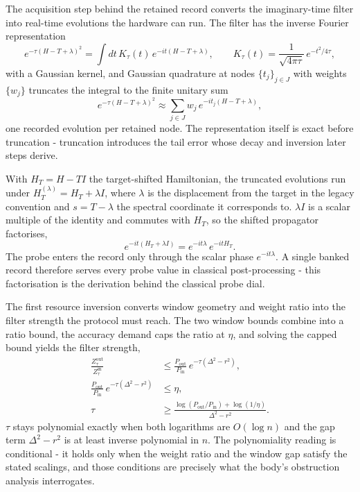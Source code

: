 The acquisition step behind the retained record converts the imaginary-time filter into real-time evolutions the hardware can run. The filter has the inverse Fourier representation
\begin{equation*}
e^{-\tau (H - T + \lambda)^2} = \int dt \, K_\tau(t) \, e^{-i t (H - T + \lambda)} , \qquad
K_\tau(t) = \frac{1}{\sqrt{4 \pi \tau}} \, e^{-t^2 / 4\tau} ,
\end{equation*}
with a Gaussian kernel, and Gaussian quadrature at nodes $\{t_j\}_{j \in J}$ with weights $\{w_j\}$ truncates the integral to the finite unitary sum
\begin{equation*}
e^{-\tau (H - T + \lambda)^2} \approx \sum_{j \in J} w_j \, e^{-i t_j (H - T + \lambda)} ,
\end{equation*}
one recorded evolution per retained node. The representation itself is exact before truncation - truncation introduces the tail error whose decay and inversion later steps derive.

With $H_T = H - T I$ the target-shifted Hamiltonian, the truncated evolutions run under $H_T^{(\lambda)} = H_T + \lambda I$, where $\lambda$ is the displacement from the target in the legacy convention and $s = T - \lambda$ the spectral coordinate it corresponds to. $\lambda I$ is a scalar multiple of the identity and commutes with $H_T$, so the shifted propagator factorises,
\begin{equation*}
e^{-i t (H_T + \lambda I)} = e^{-i t \lambda} \, e^{-i t H_T} .
\end{equation*}
The probe enters the record only through the scalar phase $e^{-i t \lambda}$. A single banked record therefore serves every probe value in classical post-processing - this factorisation is the derivation behind the classical probe dial.

The first resource inversion converts window geometry and weight ratio into the filter strength the protocol must reach. The two window bounds combine into a ratio bound, the accuracy demand caps the ratio at $\eta$, and solving the capped bound yields the filter strength,
\begin{align*}
\frac{Z_\tau^{\mathrm{out}}}{Z_\tau^{\mathrm{in}}}
&\le \frac{P_{\mathrm{out}}}{P_{\mathrm{in}}} \, e^{-\tau (\Delta^2 - r^2)} , \\
\frac{P_{\mathrm{out}}}{P_{\mathrm{in}}} \, e^{-\tau (\Delta^2 - r^2)} &\le \eta , \\
\tau &\ge \frac{\log(P_{\mathrm{out}}/P_{\mathrm{in}}) + \log(1/\eta)}{\Delta^2 - r^2} .
\end{align*}
$\tau$ stays polynomial exactly when both logarithms are $O(\log n)$ and the gap term $\Delta^2 - r^2$ is at least inverse polynomial in $n$. The polynomiality reading is conditional - it holds only when the weight ratio and the window gap satisfy the stated scalings, and those conditions are precisely what the body's obstruction analysis interrogates.

